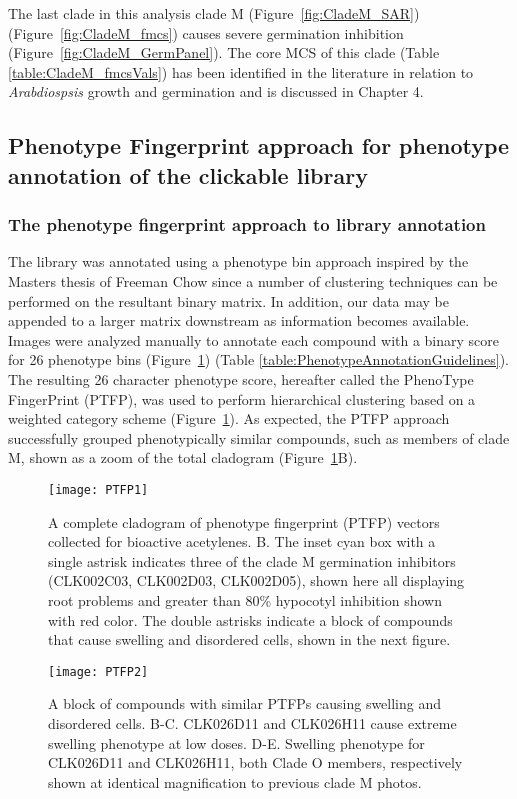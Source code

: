 The last clade in this analysis clade M (Figure~\ref{fig:CladeM_SAR})(Figure~\ref{fig:CladeM_fmcs}) causes severe germination inhibition (Figure~\ref{fig:CladeM_GermPanel}). The core MCS of this clade (Table \ref{table:CladeM_fmcsVals}) has been identified in the literature in relation to {\it Arabdiospsis} growth and germination and is discussed in Chapter 4. 


\subsection{Phenotype Fingerprint approach for phenotype annotation of the clickable library}


\subsubsection{The phenotype fingerprint approach to library annotation}

The library was annotated using a phenotype bin approach inspired by the Masters thesis of Freeman Chow \cite{chow2007latca} since a number of clustering techniques can be performed on the resultant binary matrix. In addition, our data may be appended to a larger matrix downstream as information becomes available. Images were analyzed manually to annotate each compound with a binary score for 26 phenotype bins (Figure~\ref{fig:PTFP1}) (Table \ref{table:PhenotypeAnnotationGuidelines}). The resulting 26 character phenotype score, hereafter called the PhenoType FingerPrint (PTFP), was used to perform hierarchical clustering based on a weighted category scheme (Figure~\ref{fig:PTFP1}). As expected, the PTFP approach successfully grouped phenotypically similar compounds, such as members of clade M, shown as a zoom of the total cladogram (Figure~\ref{fig:PTFP1}B).

\begin{figure}
\texttt{[image: PTFP1]}
\caption{A complete cladogram of phenotype fingerprint (PTFP) vectors collected for bioactive acetylenes. B. The inset cyan box with a single astrisk indicates three of the clade M germination inhibitors (CLK002C03, CLK002D03, CLK002D05), shown here all displaying root problems and greater than 80{\%} hypocotyl inhibition shown with red color. The double astrisks indicate a block of compounds that cause swelling and disordered cells, shown in the next figure.}
\label{fig:PTFP1}
\end{figure}

\begin{figure}
\texttt{[image: PTFP2]}
\caption{A block of compounds with similar PTFPs causing swelling and disordered cells. B-C. CLK026D11 and CLK026H11 cause extreme swelling phenotype at low doses. D-E. Swelling phenotype for CLK026D11 and CLK026H11, both Clade O members, respectively shown at identical magnification to previous clade M photos.}
\label{fig:PTFP2}
\end{figure}

